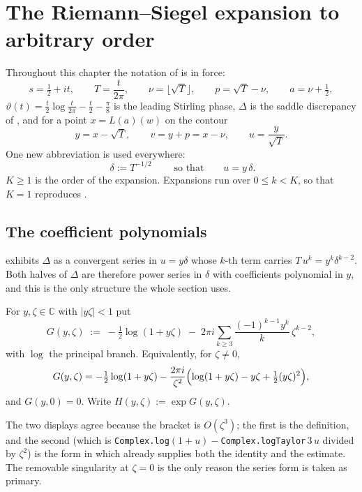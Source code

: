 
\chapter{The Riemann--Siegel expansion to arbitrary order}
\label{cha:rs_general}

Throughout this chapter the notation of  is in force:
\[
  s=\tfrac12+it,\qquad T=\frac{t}{2\pi},\qquad \nu=\lfloor\sqrt T\rfloor,\qquad
  p=\sqrt T-\nu,\qquad a=\nu+\tfrac12,
\]
$\vartheta(t)=\tfrac t2\log\tfrac t{2\pi}-\tfrac t2-\tfrac\pi8$ is the leading Stirling phase,
$\Delta$ is the saddle discrepancy of , and for a point
$x=L(a)(w)$ on the contour
\[
  y=x-\sqrt T,\qquad v=y+p=x-\nu,\qquad u=\frac{y}{\sqrt T} .
\]
One new abbreviation is used everywhere:
\[
  \boxed{\;\delta:=T^{-1/2}\;}\qquad\text{so that}\qquad u=y\,\delta .
\]
$K\ge1$ is the order of the expansion.  Expansions run over $0\le k<K$, so that $K=1$
reproduces .

\section{The coefficient polynomials}
\label{sec:rsg_coeff}

 exhibits $\Delta$ as a convergent series in $u=y\delta$ whose
$k$-th term carries $T\,u^{k}=y^{k}\delta^{k-2}$.  Both halves of $\Delta$ are therefore power
series in $\delta$ with coefficients polynomial in $y$, and this is the only structure the
whole section uses.

\begin{definition}
\label{def:rsg_series}
For $y,\zeta\in\mathbb{C}$ with $\lvert y\zeta\rvert<1$ put
\[
  G(y,\zeta)\;:=\;-\tfrac12\log(1+y\zeta)\;-\;2\pi i\sum_{k\ge3}\frac{(-1)^{k-1}y^{k}}{k}\,\zeta^{k-2},
\]
with $\log$ the principal branch.  Equivalently, for $\zeta\ne0$,
\[
  G(y,\zeta)=-\tfrac12\log(1+y\zeta)-\frac{2\pi i}{\zeta^{2}}
     \Bigl(\log(1+y\zeta)-y\zeta+\tfrac12(y\zeta)^{2}\Bigr),
\]
and $G(y,0)=0$.  Write $H(y,\zeta):=\exp G(y,\zeta)$.
\end{definition}

The two displays agree because the bracket is $O(\zeta^{3})$; the first is the definition, and
the second (which is \texttt{Complex.log}$(1+u)-$\texttt{Complex.logTaylor}$\,3\,u$ divided by
$\zeta^{2}$) is the form in which  already supplies both the
identity and the estimate.  The removable singularity at $\zeta=0$ is the only reason the series
form is taken as primary.

